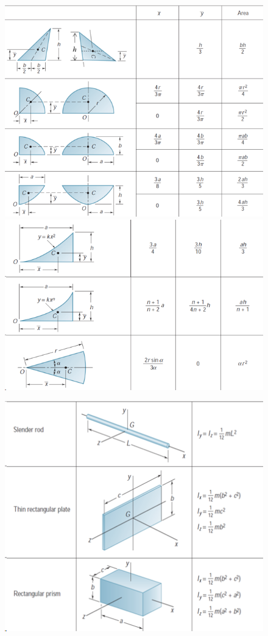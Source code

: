 \documentclass[10pt]{article}
\begin{document}
	\pagebreak
	\begin{multicols*}{2}
				\begin{figure}[H]
			\centering
			\includegraphics[width=1\linewidth]{screenshot001}
			\label{fig:screenshot001}
			\includegraphics[width=1\linewidth]{screenshot002}
		\end{figure}
				\begin{figure}[H]
			\centering
			\includegraphics[width=0.9\linewidth]{screenshot003}

\end{figure}
\end{multicols*}
\end{document}
